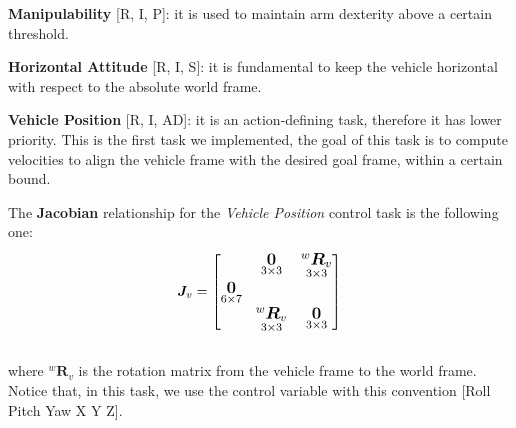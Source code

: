 \documentclass{article}
\begin{document}
\noindent
\begin{description}
 \item \textbf{Manipulability} [R, I, P]: it is used to maintain arm dexterity above a certain threshold.
 \item \textbf{Horizontal Attitude} [R, I, S]: it is fundamental to keep the vehicle horizontal with respect to the absolute world frame. 
 \item \textbf{Vehicle Position} [R, I, AD]: it is an action-defining task, therefore it has lower priority. This is the first task we implemented, the goal of this task is to compute velocities to align the vehicle frame with the desired goal frame, within a certain bound.
\end{description}

\noindent
\vspace{5px}
The \textbf{Jacobian} relationship for the \textit{Vehicle Position} control task is the following one:
\begin{equation}
\large
    \boldsymbol{J}_v = \begin{bmatrix}
 & \underset{3\times3}{\boldsymbol{0}} & \underset{3\times3}{^{w}\boldsymbol{R}_{v}} \\
\underset{6\times7}{\boldsymbol{0}} \\
& \underset{ 3\times 3}{^{w}\boldsymbol{R}_{v}} & \underset{3\times 3}{\boldsymbol{0}} \\
\end{bmatrix}
\end{equation}
\\ 
where ${^{w}\boldsymbol{R}_{v}}$ is the rotation matrix from the vehicle frame to the world frame.
Notice that, in this task, we use the control variable with this convention [Roll Pitch Yaw X Y Z].
\end{document}
